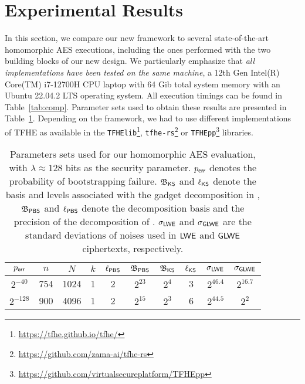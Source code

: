\section{Experimental Results}
\label{sec:comparison}


In this section, we compare our new framework to several state-of-the-art homomorphic AES executions, including the ones performed with the two building blocks of our new design.
We particularly emphasize that \textit{all implementations have been tested on the same machine}, a 12th Gen Intel(R) Core(TM) i7-12700H CPU laptop with 64 Gib total system memory with an Ubuntu 22.04.2 LTS operating system. All execution timings can be found in Table~\ref{tab:comp}.
Parameter sets used to obtain these results are presented in Table~\ref{tab:params}.
Depending on the framework, we had to use different implementations of TFHE as available in the \texttt{TFHElib}\footnote{\url{https://tfhe.github.io/tfhe/}}, \texttt{tfhe-rs}\footnote{\url{https://github.com/zama-ai/tfhe-rs}} or \texttt{TFHEpp}\footnote{\url{https://github.com/virtualsecureplatform/TFHEpp}} libraries.


\begin{table}[htbp]
\caption{Parameters sets used for our homomorphic AES evaluation, with $\lambda\approx128$ bits as the security parameter. $p_{\textsf{err}}$ denotes the probability of bootstrapping failure. $\mathfrak{B}_{\textsf{KS}}$ and $\ell_{\textsf{KS}}$ denote the basis and levels associated with the gadget decomposition in \KeySwitch, $\mathfrak{B}_{\textsf{PBS}}$ and $\ell_{\textsf{PBS}}$ denote the decomposition basis and the precision of the decomposition of \BlindRotate. $\sigma_{\textsf{LWE}}$ and $\sigma_{\textsf{GLWE}}$ are the standard deviations of noises used in $\textsf{LWE}$ and $\textsf{GLWE}$ ciphertexts, respectively.}
\label{tab:params}
\begin{adjustbox}{center}
\begin{tabular}{|c||c|c|c|c|c|c|c|c|c|}
\hline
 $p_{\textsf{err}}$ &  $n$   & $N$ & $k$   & $\ell_{\textsf{PBS}}$ & $\mathfrak{B}_{\textsf{PBS}}$ & $\mathfrak{B}_{\textsf{KS}}$ & $\ell_{\textsf{KS}}$ & $\sigma_{\textsf{LWE}}$ & $\sigma_{\textsf{GLWE}}$ \\ \hline
  $2^{-40}$ & 754     &    1024  & 1  &  2   &    $2^{23}$   &   $2^4$     &   3  &  $2^{46.4}$       &    $2^{16.7}$       \\ \hline  
    $2^{-128}$ &   900    &   4096   & 1  &   2  &   $2^{15}$   &    $2^3$    &  6 &    $2^{44.5}$      &    $2^2$      \\ \hline  
\end{tabular}
\end{adjustbox}
\end{table}


